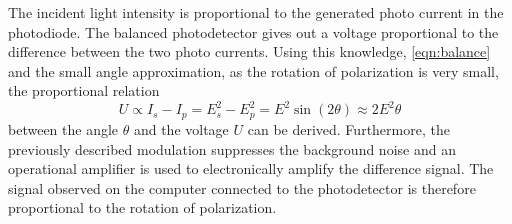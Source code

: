 The incident light intensity is proportional to the generated photo current in the photodiode.
The balanced photodetector gives out a voltage proportional to the difference between the two photo currents.
Using this knowledge, \autoref{eqn:balance} and the small angle approximation, as the rotation of polarization is very small, the proportional relation
\begin{equation}
    U \propto I_s - I_p = E_s^2 - E_p^2 = E^2 \sin(2\theta) \approx 2 E^2 \theta
\end{equation}
between the angle $\theta$ and the voltage $U$ can be derived.
Furthermore, the previously described modulation suppresses the background noise and an operational amplifier is used to electronically amplify the difference signal.
The signal observed on the computer connected to the photodetector is therefore proportional to the rotation of polarization.